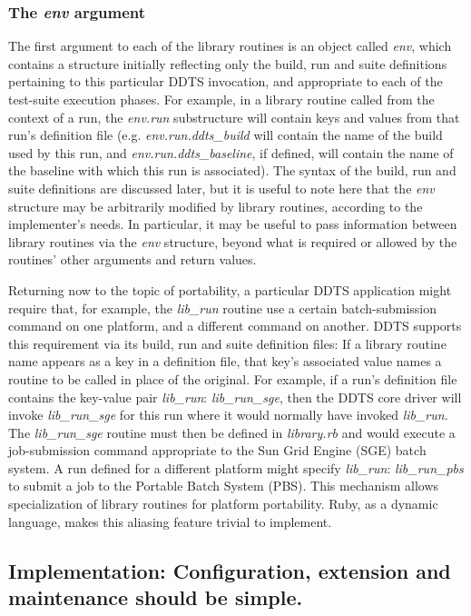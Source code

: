 \documentclass[conference]{IEEEtran}
\begin{document}
\subsubsection{The \emph{env} argument}
The first argument to each of the library routines is an object called \emph{env}, which contains a structure initially reflecting only the build, run and suite definitions pertaining to this particular DDTS invocation, and appropriate to each of the test-suite execution phases. For example, in a library routine called from the context of a run, the \emph{env.run} substructure will contain keys and values from that run's definition file (e.g. \emph{env.run.ddts_build} will contain the name of the build used by this run, and \emph{env.run.ddts\_baseline}, if defined, will contain the name of the baseline with which this run is associated). The syntax of the build, run and suite definitions are discussed later, but it is useful to note here that the \emph{env} structure may be arbitrarily modified by library routines, according to the implementer's needs. In particular, it may be useful to pass information between library routines via the \emph{env} structure, beyond what is required or allowed by the routines' other arguments and return values.

Returning now to the topic of portability, a particular DDTS application might require that, for example, the \emph{lib\_run} routine use a certain batch-submission command on one platform, and a different command on another. DDTS supports this requirement via its build, run and suite definition files: If a library routine name appears as a key in a definition file, that key's associated value names a routine to be called in place of the original. For example, if a run's definition file contains the key-value pair \emph{lib\_run}: \emph{lib\_run\_sge}, then the DDTS core driver will invoke \emph{lib\_run\_sge} for this run where it would normally have invoked \emph{lib\_run}. The \emph{lib\_run\_sge} routine must then be defined in \emph{library.rb} and would execute a job-submission command appropriate to the Sun Grid Engine (SGE) batch system. A run defined for a different platform might specify \emph{lib\_run}: \emph{lib\_run\_pbs} to submit a job to the Portable Batch System (PBS). This mechanism allows specialization of library routines for platform portability. Ruby, as a dynamic language, makes this aliasing feature trivial to implement.

\subsection{Implementation: Configuration, extension and maintenance should be simple.}
\end{document}
